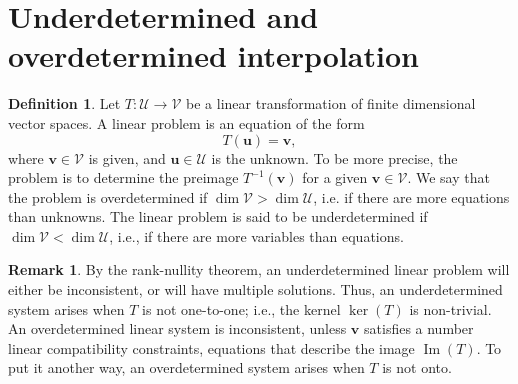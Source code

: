 \documentclass[12pt]{article}
\theoremstyle{definition}
\newtheorem{definition}[proposition]{Definition}
\newtheorem{remark}[proposition]{Remark}
\newcommand{\bu}{\mathbf{u}}
\newcommand{\bv}{\mathbf{v}}
\newcommand{\img}{\operatorname{Im}}
\newcommand{\cU}{\mathcal{U}}
\newcommand{\cV}{\mathcal{V}}
\begin{document}
\section{Underdetermined and overdetermined interpolation}
\begin{definition}
  Let $T:\cU\to \cV$ be a linear transformation of finite dimensional
  vector spaces.  A linear problem is an equation of the form
  \[ T(\bu) = \bv, \] where $\bv\in \cV$ is given, and $\bu\in \cU$ is
  the unknown.  To be more precise, the problem is to determine
  the preimage $T^{-1}(\bv)$ for a given $\bv\in \cV$.  We say that the
  problem is overdetermined if $\dim\cV>\dim \cU$, i.e. if there
  are more equations than unknowns.  The linear problem is said to be
  underdetermined if $\dim\cV<\dim\cU$, i.e., if there are more
  variables than equations.
\end{definition}

\begin{remark}
By the rank-nullity theorem, an
underdetermined linear problem will either be inconsistent, or will
have multiple solutions.  Thus, an underdetermined system arises when
$T$ is not one-to-one; i.e., the kernel $\ker(T)$ is non-trivial.  An
overdetermined linear system is inconsistent, unless $\bv$ satisfies a
number linear compatibility constraints, equations that describe the image
$\img(T)$.  To put it another way, an overdetermined system arises
when $T$ is not onto.
\end{remark}
\end{document}
